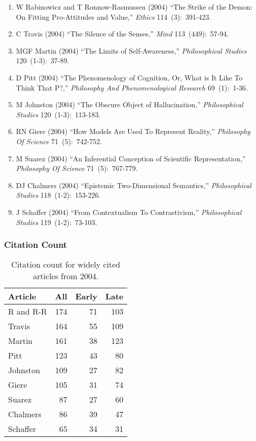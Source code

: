 \documentclass[
  10pt,
  letterpaper,
  DIV=11,
  numbers=noendperiod,
  twoside]{scrartcl}
\providecommand{\tightlist}{%
  \setlength{\itemsep}{0pt}\setlength{\parskip}{0pt}}\usepackage{longtable,booktabs,array}
\begin{document}
\begin{enumerate}
\def\labelenumi{\arabic{enumi}.}
\tightlist
\item
  W Rabinowicz and T Ronnow-Rasmussen (2004) ``The Strike of the Demon:
  On Fitting Pro-Attitudes and Value,'' \emph{Ethics} 114~(3):~391-423.
\item
  C Travis (2004) ``The Silence of the Senses,'' \emph{Mind}
  113~(449):~57-94.
\item
  MGF Martin (2004) ``The Limits of Self-Awareness,''
  \emph{Philosophical Studies} 120~(1-3):~37-89.
\item
  D Pitt (2004) ``The Phenomenology of Cognition, Or, What is It Like To
  Think That P?,'' \emph{Philosophy And Phenomenological Research}
  69~(1):~1-36.
\item
  M Johnston (2004) ``The Obscure Object of Hallucination,''
  \emph{Philosophical Studies} 120~(1-3):~113-183.
\item
  RN Giere (2004) ``How Models Are Used To Represent Reality,''
  \emph{Philosophy Of Science} 71~(5):~742-752.
\item
  M Suarez (2004) ``An Inferential Conception of Scientific
  Representation,'' \emph{Philosophy Of Science} 71~(5):~767-779.
\item
  DJ Chalmers (2004) ``Epistemic Two-Dimensional Semantics,''
  \emph{Philosophical Studies} 118~(1-2):~153-226.
\item
  J Schaffer (2004) ``From Contextualism To Contrastivism,''
  \emph{Philosophical Studies} 119~(1-2):~73-103.
\end{enumerate}

\subsubsection*{Citation Count}\label{sec-count-2004}

\begin{longtable}[]{@{}lrrr@{}}

\caption{\label{tbl-citation-count-2004}Citation count for widely cited
articles from 2004.}

\tabularnewline

\toprule\noalign{}
Article & All & Early & Late \\
\midrule\noalign{}
\endhead
\bottomrule\noalign{}
\endlastfoot
R and R-R & 174 & 71 & 103 \\
Travis & 164 & 55 & 109 \\
Martin & 161 & 38 & 123 \\
Pitt & 123 & 43 & 80 \\
Johnston & 109 & 27 & 82 \\
Giere & 105 & 31 & 74 \\
Suarez & 87 & 27 & 60 \\
Chalmers & 86 & 39 & 47 \\
Schaffer & 65 & 34 & 31 \\

\end{longtable}
\end{document}

